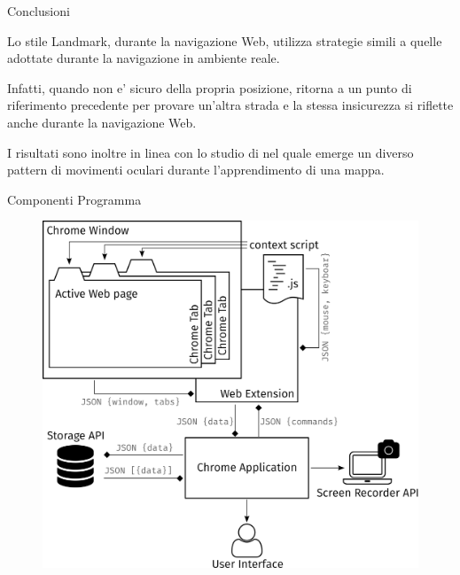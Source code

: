 
\begin{frame}[plain]{\alert{Conclusioni}}
\label{frm:conclusioni:1}

  Lo stile Landmark, durante la navigazione Web, utilizza strategie simili a quelle adottate
  durante la navigazione in ambiente reale.
  \vspace{1em}

  Infatti, quando non e' sicuro della propria posizione, ritorna a un punto di riferimento
  precedente per provare un'altra strada \parencite{nori2010familiarity} e la stessa insicurezza si riflette anche durante la navigazione Web.
  \vspace{1em}

I risultati sono inoltre in linea con lo studio di \textcite{piccardi2016navigational} nel quale emerge un diverso pattern di movimenti oculari durante l'apprendimento di una mappa.
\end{frame}

\begin{frame}[plain]{\alert{Componenti Programma}}
  \begin{figure}
    \includegraphics[height=0.8\textheight]{img/soft_scheme.png}
  \end{figure}
\end{frame}
